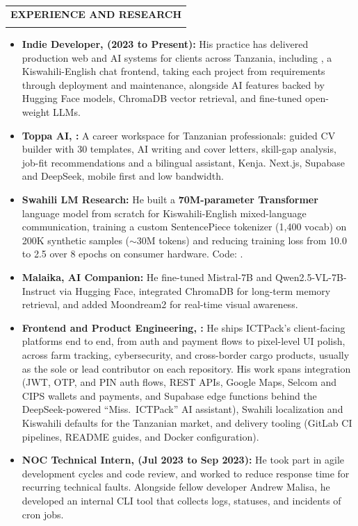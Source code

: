 \documentclass[12pt,a4paper]{article}
\makeatletter
\newcommand{\dottedsection}[1]{%
  \par\vspace{1.5em}%
  \noindent
  \begin{tabular}{@{}l@{}}
    {\large\textbf{\uppercase{#1}}} \\[-0.6em]
    \makebox[\widthof{\large\textbf{\uppercase{#1}}}]{\dotfill}
  \end{tabular}%
  \par\vspace{0.5em}%
}
\makeatother
\begin{document}
\vspace{1em}

\dottedsection{Experience and Research}
\begin{itemize}[leftmargin=1.5em, itemsep=0pt, parsep=0pt, topsep=2pt]
    \item \textbf{Indie Developer,  (2023 to Present):} His practice has delivered production web and AI systems for clients across Tanzania, including , a Kiswahili-English chat frontend, taking each project from requirements through deployment and maintenance, alongside AI features backed by Hugging Face models, ChromaDB vector retrieval, and fine-tuned open-weight LLMs.
    \item \textbf{Toppa AI, :} A career workspace for Tanzanian professionals: guided CV builder with 30 templates, AI writing and cover letters, skill-gap analysis, job-fit recommendations and a bilingual assistant, Kenja. Next.js, Supabase and DeepSeek, mobile first and low bandwidth.
    \item \textbf{Swahili LM Research:} He built a \textbf{70M-parameter Transformer} language model from scratch for Kiswahili-English mixed-language communication, training a custom SentencePiece tokenizer (1,400 vocab) on 200K synthetic samples ($\sim$30M tokens) and reducing training loss from 10.0 to 2.5 over 8 epochs on consumer hardware. Code: .
    \item \textbf{Malaika, AI Companion:} He fine-tuned Mistral-7B and Qwen2.5-VL-7B-Instruct via Hugging Face, integrated ChromaDB for long-term memory retrieval, and added Moondream2 for real-time visual awareness.
    \item \textbf{Frontend and Product Engineering, :} He ships ICTPack's client-facing platforms end to end, from auth and payment flows to pixel-level UI polish, across farm tracking, cybersecurity, and cross-border cargo products, usually as the sole or lead contributor on each repository. His work spans integration (JWT, OTP, and PIN auth flows, REST APIs, Google Maps, Selcom and CIPS wallets and payments, and Supabase edge functions behind the DeepSeek-powered ``Miss.\ ICTPack'' AI assistant), Swahili localization and Kiswahili defaults for the Tanzanian market, and delivery tooling (GitLab CI pipelines, README guides, and Docker configuration).
    \item \textbf{NOC Technical Intern,  (Jul 2023 to Sep 2023):} He took part in agile development cycles and code review, and worked to reduce response time for recurring technical faults. Alongside fellow developer Andrew Malisa, he developed an internal CLI tool that collects logs, statuses, and incidents of cron jobs.
\end{itemize}
\end{document}
